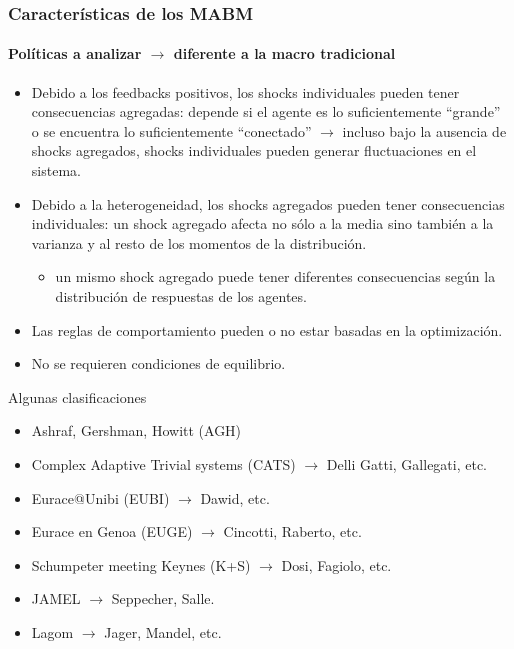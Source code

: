 \documentclass[11pt]{beamer}
\begin{document}
\begin{frame}
	\frametitle{Características de los MABM}
\framesubtitle{Políticas a analizar $\rightarrow$ diferente a la macro tradicional}
    \begin{itemize}
        \item Debido a los feedbacks positivos, los shocks individuales pueden tener consecuencias agregadas: depende si el agente es lo suficientemente ``grande'' o se encuentra lo suficientemente ``conectado'' $\rightarrow$ incluso bajo la ausencia de shocks agregados, shocks individuales pueden generar fluctuaciones en el sistema.
        \item Debido a la heterogeneidad, los shocks agregados pueden tener consecuencias individuales: un shock agregado afecta no sólo a la media sino también a la varianza y al resto de los momentos de la distribución.
        \begin{itemize}
            \item un mismo shock agregado puede tener diferentes consecuencias según la distribución de respuestas de los agentes.
        \end{itemize}
        \item Las reglas de comportamiento pueden o no estar basadas en la optimización. 
        \item No se requieren condiciones de equilibrio.
    \end{itemize}
\end{frame}



\begin{frame}{Algunas clasificaciones}
    \begin{itemize}
        \item Ashraf, Gershman, Howitt (AGH)
        \item Complex Adaptive Trivial systems (CATS) $\rightarrow$ Delli Gatti, Gallegati, etc.
        \item Eurace@Unibi (EUBI) $\rightarrow$ Dawid, etc.
        \item Eurace en Genoa (EUGE) $\rightarrow$ Cincotti, Raberto, etc.
        \item Schumpeter meeting Keynes (K+S) $\rightarrow$ Dosi, Fagiolo, etc.
        \item JAMEL $\rightarrow$ Seppecher, Salle.
        \item Lagom $\rightarrow$ Jager, Mandel, etc.
    \end{itemize}
\end{frame}
\end{document}
